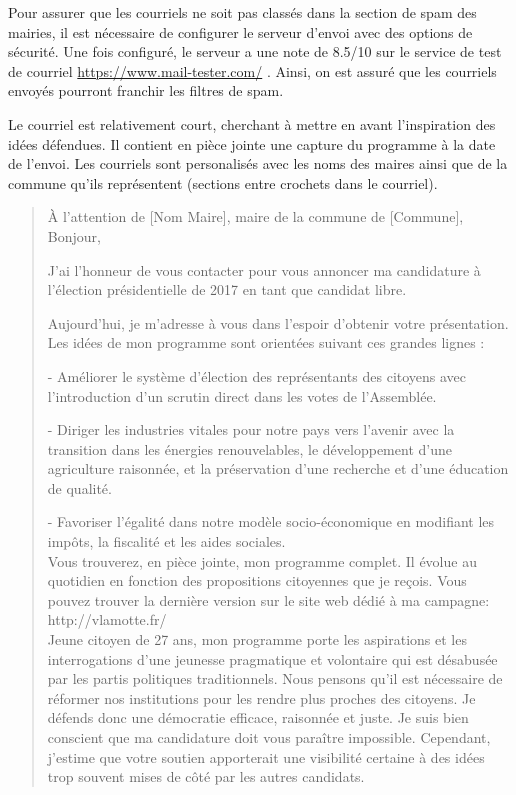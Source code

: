 \documentclass{article}
\begin{document}
Pour assurer que les courriels ne soit pas classés dans la section de spam des mairies, il est nécessaire de configurer le serveur d'envoi avec des options de sécurité. Une fois configuré, le serveur a une note de 8.5/10 sur le service de test de courriel \url{https://www.mail-tester.com/} . Ainsi, on est assuré que les courriels envoyés pourront franchir les filtres de spam.

Le courriel est relativement court, cherchant à mettre en avant l'inspiration des idées défendues. Il contient en pièce jointe une capture du programme à la date de l'envoi. Les courriels sont personalisés avec les noms des maires ainsi que de la commune qu'ils représentent (sections entre crochets dans le courriel).

\begin{framed}
\begin{quotation}
À l’attention de [Nom Maire], maire de la commune de [Commune],\\

Bonjour,

J’ai l’honneur de vous contacter pour vous annoncer ma candidature à l’élection présidentielle de 2017 en tant que candidat libre.

Aujourd’hui, je m’adresse à vous dans l’espoir d’obtenir votre présentation.\\

Les idées de mon programme sont orientées suivant ces grandes lignes :

- Améliorer le système d’élection des représentants des citoyens avec
l’introduction d’un scrutin direct dans les votes de l’Assemblée.

- Diriger les industries vitales pour notre pays vers l’avenir avec la
transition dans les énergies renouvelables, le développement d’une
agriculture raisonnée, et la préservation d’une recherche et d’une
éducation de qualité.

- Favoriser l’égalité dans notre modèle socio-économique en modifiant
les impôts, la fiscalité et les aides sociales.\\

Vous trouverez, en pièce jointe, mon programme complet. Il évolue au quotidien en fonction des propositions citoyennes que je reçois. Vous pouvez trouver la dernière version sur le site web dédié à ma campagne: http://vlamotte.fr/\\

Jeune citoyen de 27 ans, mon programme porte les aspirations et les interrogations d’une jeunesse pragmatique et volontaire qui est désabusée par les partis politiques traditionnels. Nous pensons qu’il est nécessaire de réformer nos institutions pour les rendre plus proches des citoyens. Je défends donc une démocratie efficace, raisonnée et juste. Je suis bien conscient que ma candidature doit vous paraître impossible. Cependant, j’estime que votre soutien apporterait une visibilité certaine à des idées trop souvent mises de côté par les autres candidats.\\


\end{quotation}
\end{framed}
\end{document}
